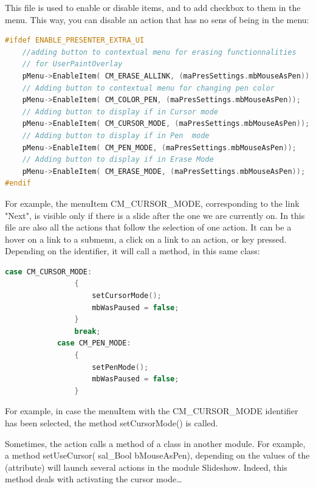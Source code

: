 \documentclass[a4paper,11pt]{article}
\begin{document}
This file is used to enable or disable items, and to add checkbox to them in the menu. This way, you can disable an action that has no sens of being in the menu:

\begin{lstlisting}[language=C++]
#ifdef ENABLE_PRESENTER_EXTRA_UI
	//adding button to contextual menu for erasing functionnalities
	// for UserPaintOverlay
	pMenu->EnableItem( CM_ERASE_ALLINK, (maPresSettings.mbMouseAsPen));
	// Adding button to contextual menu for changing pen color
	pMenu->EnableItem( CM_COLOR_PEN, (maPresSettings.mbMouseAsPen));
	// Adding button to display if in Cursor mode
	pMenu->EnableItem( CM_CURSOR_MODE, (maPresSettings.mbMouseAsPen));
	// Adding button to display if in Pen  mode
	pMenu->EnableItem( CM_PEN_MODE, (maPresSettings.mbMouseAsPen));
	// Adding button to display if in Erase Mode
	pMenu->EnableItem( CM_ERASE_MODE, (maPresSettings.mbMouseAsPen));
#endif
\end{lstlisting}

For example, the menuItem CM\_CURSOR\_MODE, corresponding to the link "Next", is visible only if there is a slide after the one we are currently on.
In this file are also all the actions that follow the selection of one action. It can be a hover on a link to a submenu, a click on a link to an action, or key pressed. Depending on the identifier, it will call a method, in this same class:

\begin{lstlisting}[language=C++]
            case CM_CURSOR_MODE:
                {
                    setCursorMode();
                    mbWasPaused = false;
                }
                break;
            case CM_PEN_MODE:
                {
                    setPenMode();
                    mbWasPaused = false;
                }
\end{lstlisting}

For example, in case the menuItem with the CM\_CURSOR\_MODE identifier has been selected, the method setCursorMode() is called.

Sometimes, the action calls a method of a class in another module. For example, a method setUseCursor( sal\_Bool bMouseAsPen), depending on the values of the (attribute) will launch several actions in the module Slideshow. Indeed, this method deals with activating the cursor mode\dots
\end{document}
